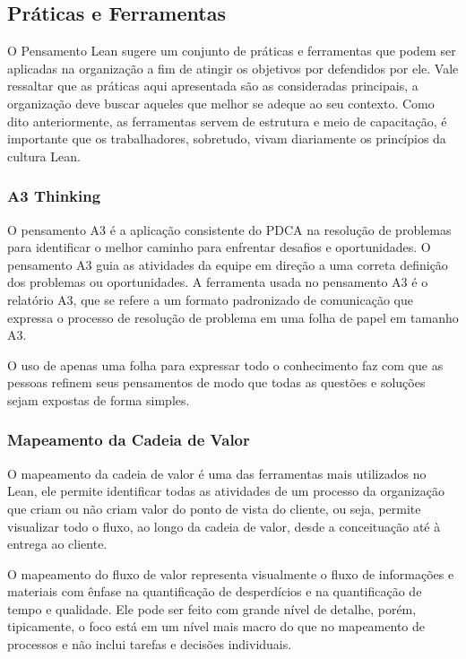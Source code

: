 \subsection[Práticas e Ferramentas]{Práticas e Ferramentas}

O Pensamento Lean sugere um conjunto de práticas e ferramentas que podem ser aplicadas na organização a fim de atingir os objetivos por defendidos por ele. Vale ressaltar que as práticas aqui apresentada são as consideradas principais, a organização deve buscar aqueles que melhor se adeque ao seu contexto. Como dito anteriormente, as ferramentas servem de estrutura e meio de capacitação, é importante que os trabalhadores, sobretudo, vivam diariamente os princípios da cultura Lean.

\subsubsection[A3 Thinking]{A3 Thinking}

O pensamento A3 é a aplicação consistente do PDCA na resolução de problemas para identificar o melhor caminho para enfrentar desafios e oportunidades. O pensamento A3 guia as atividades da equipe em direção a uma correta definição dos problemas ou oportunidades. A ferramenta usada no pensamento A3 é o relatório A3, que se refere a um formato padronizado de comunicação que expressa o processo de resolução de problema em uma folha de papel em tamanho A3.

O uso de apenas uma folha para expressar todo o conhecimento faz com que as pessoas refinem seus pensamentos de modo que todas as questões e soluções sejam expostas de forma simples. 

\subsubsection[Mapeamento da Cadeia de Valor]{Mapeamento da Cadeia de Valor}

O mapeamento da cadeia de valor é uma das ferramentas mais utilizados no Lean, ele permite identificar todas as atividades de um processo da organização que criam ou não criam valor do ponto de vista do cliente, ou seja, permite visualizar todo o fluxo, ao longo da cadeia de valor, desde a conceituação até à entrega ao cliente.

O mapeamento do fluxo de valor representa visualmente o fluxo de informações e materiais com ênfase na quantificação de desperdícios e na quantificação de tempo e qualidade. Ele pode ser feito com grande nível de detalhe, porém, tipicamente, o foco está em um nível mais macro do que no mapeamento de processos  e não inclui tarefas e decisões individuais.

